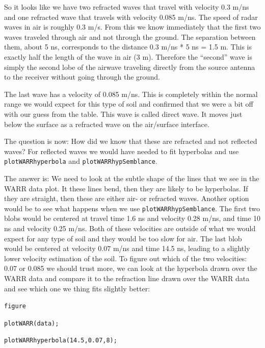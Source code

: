 \documentclass[11pt]{article}
\begin{document}
So it looks like we have two refracted waves that travel with velocity
0.3 m/ns and one refracted wave that travels with velocity 0.085
m/ns. The speed of radar waves in air is roughly 0.3 m/s. From this we
know immediately that the first two waves traveled through air and not
through the ground. The separation between them, about 5 ns,
corresponds to the distance 0.3 m/ns * 5 ns = 1.5 m. This is exactly
half the length of the wave in air (3 m). Therefore the ``second''
wave is simply the second lobe of the airwave traveling directly from
the source antenna to the receiver without going through the ground.

The last wave has a velocity of 0.085 m/ns. This is completely within
the normal range we would expect for this type of soil and confirmed
that we were a bit off with our guess from the table. This wave is
called direct wave. It moves just below the surface as a refracted
wave on the air/surface interface.

The question is now: How did we know that these are refracted and not
reflected waves? For reflected waves we would have needed to fit
hyperbolas and use \verb#plotWARRhyperbola# and \linebreak
\verb#plotWARRhypSemblance#.

The answer is: We need to look at the subtle shape of the lines that
we see in the WARR data plot. It these lines bend, then they are
likely to be hyperbolas. If they are straight, then these are either
air- or refracted waves. Another option would be to see what happens
when we use \verb#plotWARRhypSemblance#.  The first two blobs would be
centered at travel time 1.6 ns and velocity 0.28 m/ns, and time 10 ns
and velocity 0.25 m/ns. Both of these velocities are outside of what
we would expect for any type of soil and they would be too slow for
air. The last blob would be centered at velocity 0.07 m/ns and time
14.5 ns, leading to a slightly lower velocity estimation of the
soil. To figure out which of the two velocities: 0.07 or 0.085 we
should trust more, we can look at the hyperbola drawn over the WARR
data and compare it to the refraction line drawn over the WARR data
and see which one we thing fits slightly better:

\qquad \verb#figure#

\qquad \verb#plotWARR(data);#

\qquad \verb#plotWARRhyperbola(14.5,0.07,8);#
\end{document}
